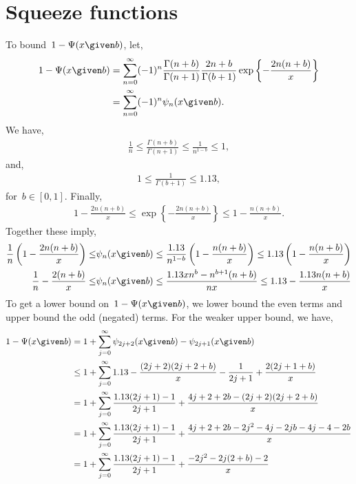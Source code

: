 \appendix

\section{Squeeze functions}
To bound~$1-\Psi(x \given b)$, let,
\begin{align}
1-\Psi(x \given b) 
  &=
    \sum_{n=0}^\infty (-1)^n \frac{\Gamma(n+b)}{\Gamma(n+1)} \frac{2n+b}{\Gamma(b+1)}
    \exp\left\{- \frac{2n(n+b)}{x} \right\} \\
  &= \sum_{n=0}^\infty (-1)^n \psi_n(x \given b).
\end{align}
We have,
\begin{align}
\frac{1}{n} \leq \frac{\Gamma(n+b)}{\Gamma(n+1)} \leq \frac{1}{n^{1-b}} \leq 1,
\end{align}
and,
\begin{align}
1 \leq \frac{1}{\Gamma(b+1)} \leq 1.13,
\end{align}
for~$b \in [0,1]$. Finally,
\begin{align}
1 - \frac{2n(n+b)}{x} \leq \exp \left\{ - \frac{2n(n+b)}{x}   \right\} \leq 1 - \frac{n(n+b)}{x}.
\end{align}
Together these imply,
\begin{align}
\frac{1}{n} \left( 1 - \frac{2n(n+b)}{x} \right) \leq 
&\psi_n(x \given b) \leq
\frac{1.13}{n^{1-b}} \left( 1 - \frac{n(n+b)}{x} \right)  \leq 
1.13 \left( 1 - \frac{n(n+b)}{x} \right) \\
\frac{1}{n} -\frac{2(n+b)}{x} \leq 
&\psi_n(x \given b) \leq
\frac{1.13xn^b - n^{b+1}(n+b)}{n x } \leq 
1.13 -\frac{1.13 n(n+b)}{x}
\end{align}
To get a lower bound on~${1-\Psi(x \given b)}$, we lower bound the even terms 
and upper bound the odd (negated) terms.
For the weaker upper bound, we have,
\begin{align}
1-\Psi(x \given b) 
  &= 1 + \sum_{j=0}^\infty \psi_{2j+2}(x \given b) - \psi_{2j+1}(x \given b) \\
  &\leq 1 + \sum_{j=0}^\infty 1.13 - \frac{(2j+2)(2j+2+b)}{x} - \frac{1}{2j+1} + \frac{2(2j+1+b)}{x} \\
  &= 1 + \sum_{j=0}^\infty \frac{1.13(2j+1)-1}{2j+1} + \frac{4j+2+2b - (2j+2)(2j+2+b)}{x} \\ 
  &= 1 + \sum_{j=0}^\infty \frac{1.13(2j+1)-1}{2j+1} + \frac{4j+2+2b - 2j^2 -4j -2jb -4j - 4 -2b}{x} \\
  &= 1 + \sum_{j=0}^\infty \frac{1.13(2j+1)-1}{2j+1} + \frac{-2j^2 -2j(2+b) - 2}{x}
\end{align}

